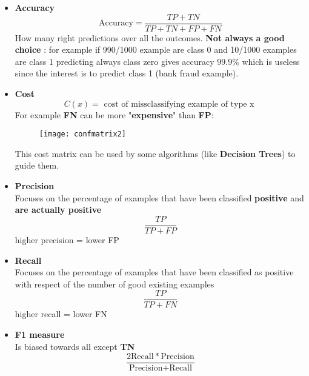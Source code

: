 \begin{itemize}
\item  \textbf{Accuracy}
$$ \text{Accuracy} = \frac{TP + TN}{TP+TN+FP+FN}$$
How many right predictions over all the outcomes. \textbf{Not always a good choice} :  for example if 990/1000 example are class 0 and 10/1000 examples are class 1 predicting always class zero gives accuracy $99.9 \%$ which is useless since the interest is to predict class 1 (bank fraud example).
\item \textbf{Cost}
$$ C(x) = \text{ cost of missclassifying example of type x }$$
For example \textbf{FN} can be more "\textbf{expensive}" than \textbf{FP}:
\begin{figure}[H]
  \centering
  \texttt{[image: confmatrix2]}
\end{figure}
This cost matrix can be used by some algorithms (like \textbf{Decision Trees}) to guide them.
\item \textbf{Precision}\\
Focuses on the percentage of examples that have been classified \textbf{positive} and \textbf{are actually positive}
$$ \frac{TP}{TP+FP}$$
higher precision = lower FP
\item \textbf{Recall}\\
Focuses on the percentage of examples that have been classified as positive with respect of the number of good existing examples 
$$ \frac{TP}{TP+FN}$$
higher recall = lower FN
\item \textbf{F1 measure}\\
Is biased towards all except \textbf{TN}
$$ \frac{2 \text{Recall} * \text{Precision}}{\text{Precision} + \text{Recall}}$$
\end{itemize}

